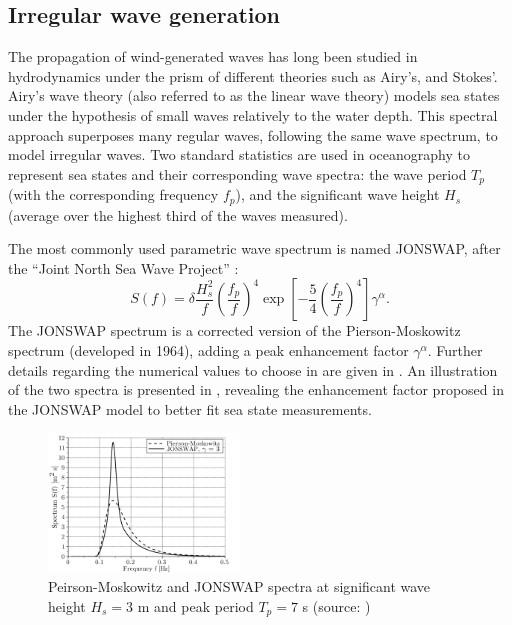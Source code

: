 \subsection{Irregular wave generation}

The propagation of wind-generated waves has long been studied in hydrodynamics under the prism of different theories such as Airy's, and Stokes'. 
Airy's wave theory (also referred to as the linear wave theory) models sea states under the hypothesis of small waves relatively to the water depth.  
This spectral approach superposes many regular waves, following the same wave spectrum, to model irregular waves. 
Two standard statistics are used in oceanography to represent sea states and their corresponding wave spectra: 
the wave period $T_p$ (with the corresponding frequency $f_p$), and the significant wave height $H_s$ (average over the highest third of the waves measured). 

The most commonly used parametric wave spectrum is named JONSWAP, after the ``Joint North Sea Wave Project'' \citep{jonswap_1973}: 
\begin{equation}
    S(f) = \delta \frac{H_s^2}{f} \left(\frac{f_p}{f}\right)^4 \exp\left[-\frac54 \left(\frac{f_p}{f}\right)^4 \right] \gamma^\alpha.
    \label{eq:jonswap}
\end{equation}
The JONSWAP spectrum is a corrected version of the Pierson-Moskowitz spectrum (developed in 1964), adding a peak enhancement factor $\gamma^\alpha$. 
Further details regarding the numerical values to choose in  are given in \citet{burton_2021_wind_handbook}. 
An illustration of the two spectra is presented in , revealing the enhancement factor proposed in the JONSWAP model to better fit sea state measurements. 

\begin{figure}%
    \centering
    \includegraphics[width=0.45\textwidth]{./part1/figures/jonswap.png}
    \caption{Peirson-Moskowitz and JONSWAP spectra at significant wave height $H_s = 3$
    m and peak period $T_p = 7$ s (source: \citealp{milano_thesis_2021})}
    \label{fig:jonswap}
\end{figure}

